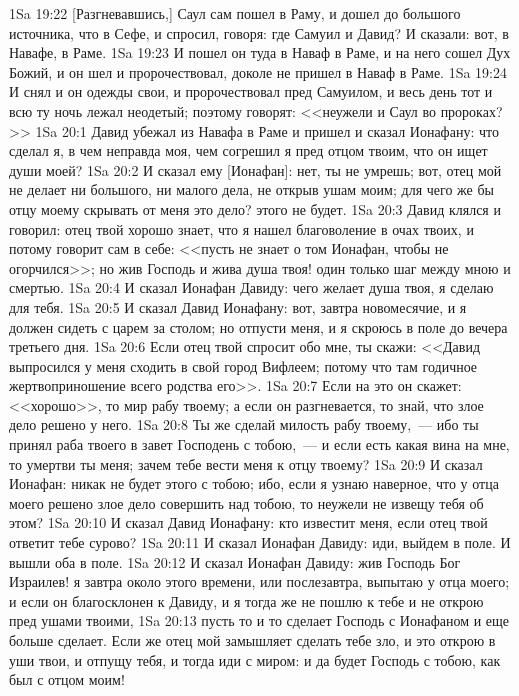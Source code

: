 \vs 1Sa 19:22 [Разгневавшись,] Саул сам пошел в Раму, и дошел до большого источника, что в Сефе, и спросил, говоря: где Самуил и Давид? И сказали: вот, в Навафе, в Раме.
\vs 1Sa 19:23 И пошел он туда в Наваф в Раме, и на него сошел Дух Божий, и он шел и пророчествовал, доколе не пришел в Наваф в Раме.
\vs 1Sa 19:24 И снял и он одежды свои, и пророчествовал пред Самуилом, и весь день тот и всю ту ночь лежал неодетый; поэтому говорят: <<неужели и Саул во пророках?>>
\vs 1Sa 20:1 Давид убежал из Навафа в Раме и пришел и сказал Ионафану: что сделал я, в чем неправда моя, чем согрешил я пред отцом твоим, что он ищет души моей?
\vs 1Sa 20:2 И сказал ему [Ионафан]: нет, ты не умрешь; вот, отец мой не делает ни большого, ни малого дела, не открыв ушам моим; для чего же бы отцу моему скрывать от меня это дело? этого не будет.
\vs 1Sa 20:3 Давид клялся и говорил: отец твой хорошо знает, что я нашел благоволение в очах твоих, и потому говорит сам в себе: <<пусть не знает о том Ионафан, чтобы не огорчился>>; но жив Господь и жива душа твоя! один только шаг между мною и смертью.
\vs 1Sa 20:4 И сказал Ионафан Давиду: чего желает душа твоя, я сделаю для тебя.
\vs 1Sa 20:5 И сказал Давид Ионафану: вот, завтра новомесячие, и я должен сидеть с царем за столом; но отпусти меня, и я скроюсь в поле до вечера третьего дня.
\vs 1Sa 20:6 Если отец твой спросит обо мне, ты скажи: <<Давид выпросился у меня сходить в свой город Вифлеем; потому что там годичное жертвоприношение всего родства его>>.
\vs 1Sa 20:7 Если на это он скажет: <<хорошо>>, то мир рабу твоему; а если он разгневается, то знай, что злое дело решено у него.
\vs 1Sa 20:8 Ты же сделай милость рабу твоему,~--- ибо ты принял раба твоего в завет Господень с тобою,~--- и если есть какая вина на мне, то умертви ты меня; зачем тебе вести меня к отцу твоему?
\vs 1Sa 20:9 И сказал Ионафан: никак не будет этого с тобою; ибо, если я узнаю наверное, что у отца моего решено злое дело совершить над тобою, то неужели не извещу тебя об этом?
\vs 1Sa 20:10 И сказал Давид Ионафану: кто известит меня, если отец твой ответит тебе сурово?
\vs 1Sa 20:11 И сказал Ионафан Давиду: иди, выйдем в поле. И вышли оба в поле.
\vs 1Sa 20:12 И сказал Ионафан Давиду: жив Господь Бог Израилев! я завтра около этого времени, или послезавтра, выпытаю у отца моего; и если он благосклонен к Давиду, и я тогда же не пошлю к тебе и не открою пред ушами твоими,
\vs 1Sa 20:13 пусть то и то сделает Господь с Ионафаном и еще больше сделает. Если же отец мой замышляет сделать тебе зло, и это открою в уши твои, и отпущу тебя, и тогда иди с миром: и да будет Господь с тобою, как был с отцом моим!
